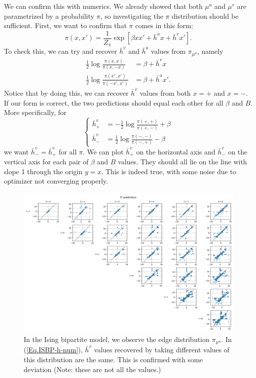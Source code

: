 \documentclass[12pt]{article}
\numberwithin{equation}{section}
\begin{document}
We can confirm this with numerics. We already showed that both $\mu^a$ and $\mu^v$ are parametrized by a probability $\pi$, so investigating the
$\pi$ distribution should be sufficient. First, we want to confirm that $\pi$ comes in this form:
\begin{equation}
    \pi(x, x') = \frac1{Z_\pi} \exp\left[\beta xx' + \bar{h}^a x + \bar{h}^v x'\right].
\end{equation}
To check this, we can try and recover $\bar{h}^v$ and $\bar{h}^a$ values from $\pi_{\mu^a}$, namely
\begin{equation}
    \begin{aligned}
        \frac12\log\frac{\pi(x, x)}{\pi(x, -x)}     & = \beta + \bar{h}^v x   \\
        \frac12\log\frac{\pi(x', x')}{\pi(-x', x')} & = \beta + \bar{h}^a x'.
    \end{aligned}
    \label{Eq.ISBP-h-num}
\end{equation}
Notice that by doing this, we can recover $\bar{h}^v$ values from both $x=+$ and $x=-$. If our form is correct,
the two predictions should equal each other for all $\beta$ and $B$. More specifically, for
\begin{equation*}
    \begin{cases}
        \bar{h}^v_+ & = -\frac12\log\frac{\pi(+, +)}{\pi(+, -)} + \beta \\
        \bar{h}^v_- & = \frac12\log\frac{\pi(-, -)}{\pi(-, +)} - \beta
    \end{cases}
\end{equation*}
we want $\bar{h}^v_- = \bar{h}^v_+$ for all $\pi$. We can plot $\bar{h}^v_+$ on the horizontal axis and $\bar{h}^v_-$
on the vertical axis for each pair of $\beta$ and $B$ values. They should all lie on the line with slope 1 through the
origin $y = x$. This is indeed true, with some noise due to optimizer not converging properly.
\begin{figure}[!h]
    \centering
    \includegraphics[width=16cm]{img/Ising_bptt/hv_pred.png}
    \caption{In the Ising bipartite model, we observe the edge distribution $\pi_{\mu^a}$. In (\ref{Eq.ISBP-h-num}), $\bar{h}^v$
        values recovered by taking different values of this distribution are the same. This is confirmed with some
        deviation (Note: these are not all the values.)}
    \label{Fig.ISBP-hv-guess}
\end{figure}
\end{document}
